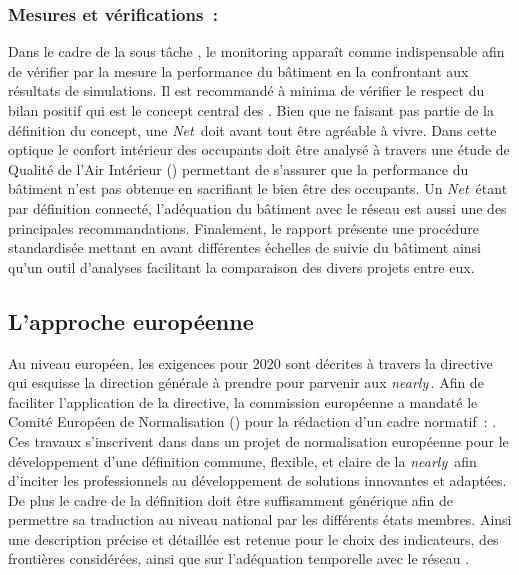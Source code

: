 \subsubsection{Mesures et vérifications~:} %
\label{ssub:mesures_et_verifications}
Dans le cadre de la sous tâche  \parencite{Noris2013}, le monitoring apparaît comme indispensable
afin de vérifier par la mesure la performance du bâtiment en la confrontant aux
résultats de simulations. Il est recommandé à minima de vérifier le respect du bilan
positif qui est le concept central des . Bien que ne faisant pas partie de
la définition du concept, une \textit{Net}\, doit avant tout être agréable à vivre. Dans cette
optique le confort intérieur des occupants doit être analysé à travers une étude de
Qualité de l’Air Intérieur () permettant de s’assurer que la performance du bâtiment n’est pas
obtenue en sacrifiant le bien être des occupants. Un \textit{Net}\, étant par définition connecté,
l’adéquation du bâtiment avec le réseau est aussi une des principales recommandations.
Finalement, le rapport présente une procédure standardisée mettant en avant différentes échelles
de suivie du bâtiment ainsi qu’un outil d’analyses facilitant la comparaison des divers projets entre eux.


\subsection{L’approche européenne} %
\label{ssub:l_approche_europeenne}
Au niveau européen, les exigences pour $2020$ sont décrites à travers la directive
 \parencite{EPBD2010} qui esquisse la direction générale à prendre pour
parvenir aux \textit{nearly}\,. Afin de faciliter l’application de la directive, la commission
européenne a mandaté le Comité Européen de Normalisation ()
pour la rédaction d’un cadre normatif~:  \parencite{CEN2013}. Ces travaux s’inscrivent
dans dans un projet de normalisation européenne pour le développement d’une définition
commune, flexible, et claire de la \textit{nearly}\, afin d’inciter les professionnels au développement
de solutions innovantes et adaptées. De plus le cadre de la définition doit être
suffisamment générique afin de permettre sa traduction au niveau national par les différents
états membres. Ainsi une description précise et détaillée est retenue pour le choix des indicateurs,
des frontières considérées, ainsi que sur l’adéquation temporelle avec le réseau \parencite{Zirngibl2014}.



